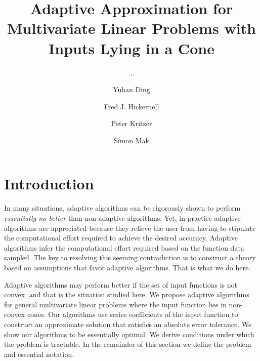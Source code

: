 \documentclass[USenglish]{article}
\theoremstyle{dgthm}
\theoremstyle{dgthm}
\theoremstyle{dgthm}
\theoremstyle{dgthm}
\theoremstyle{dgdef}
\begin{document}

  \author[1]{Yuhan Ding}
  \author*[2]{Fred J. Hickernell}
  \author[3]{Peter Kritzer} 
  \author[4]{Simon Mak}
  \title{Adaptive Approximation for Multivariate Linear Problems with Inputs Lying in a Cone}
  \subtitle{...}
  \aop

\maketitle


\section{Introduction} 

In many situations, adaptive algorithms can be rigorously shown to perform \emph{essentially no better} than non-adaptive algorithms.  Yet, in practice adaptive algorithms are appreciated because they relieve the user from having to stipulate the computational effort required to achieve the desired accuracy.  Adaptive algorithms infer the computational effort required based on the function data sampled.  The key to resolving this seeming contradiction is to construct a theory based on assumptions that favor adaptive algorithms.  That is what we do here.

Adaptive algorithms may perform better if the set of input functions is not convex, and that is the situation studied here. We propose adaptive algorithms for general multivariate linear problems where the input function lies in non-convex cones.  Our algorithms use series coefficients of the input function to construct an approximate solution that satisfies an absolute error tolerance.  We show our algorithms to be essentially optimal.  We derive conditions under which the problem is tractable.  In the remainder of this section we define the problem and essential notation.
\end{document}

